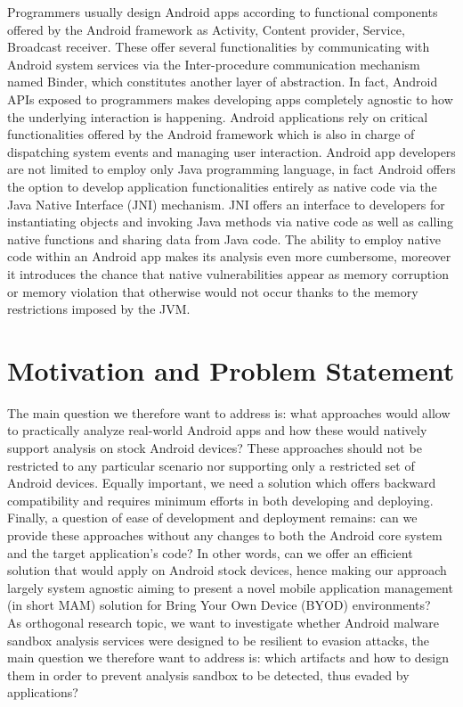 Programmers usually design Android apps according to functional components offered by the Android framework as Activity, Content provider, Service, Broadcast receiver. These offer several functionalities by communicating with Android system services via the Inter-procedure communication mechanism named Binder, which constitutes another layer of abstraction. In fact, Android APIs exposed to programmers makes developing apps completely agnostic to how the underlying interaction is happening. Android applications rely on critical functionalities offered by the Android framework which is also in charge of dispatching system events and managing user interaction. Android app developers are not limited to employ only Java programming language, in fact Android offers the option to develop application functionalities entirely as native code via the Java Native Interface (JNI) mechanism. JNI offers an interface to developers for instantiating objects and invoking Java methods via native code as well as calling native functions and sharing data from Java code. The ability to employ native code within an Android app makes its analysis even more cumbersome, moreover it introduces the chance that native vulnerabilities appear as memory corruption or memory violation that otherwise would not occur thanks to the memory restrictions imposed by the JVM.


\section{Motivation and Problem Statement}

The main question we therefore want to address is: what approaches would allow to practically analyze real-world Android apps and how these would natively support analysis on stock Android devices? These approaches should not be restricted to any particular scenario nor supporting only a restricted set of Android devices. Equally important, we need a solution which offers backward compatibility and requires minimum efforts in both developing and deploying. Finally, a question of ease of development and deployment remains: can we provide these approaches without any changes to both the Android core system and the target application's code? In other words, can we offer an efficient solution that would apply on Android stock devices, hence making our approach largely system agnostic aiming to present a novel mobile application management (in short MAM) solution for Bring Your Own Device (BYOD) environments? \\
As orthogonal research topic, we want to investigate whether Android malware sandbox analysis services were designed to be resilient to evasion attacks, the main question we therefore want to address is: which artifacts and how to design them in order to prevent analysis sandbox to be detected, thus evaded by applications? 

